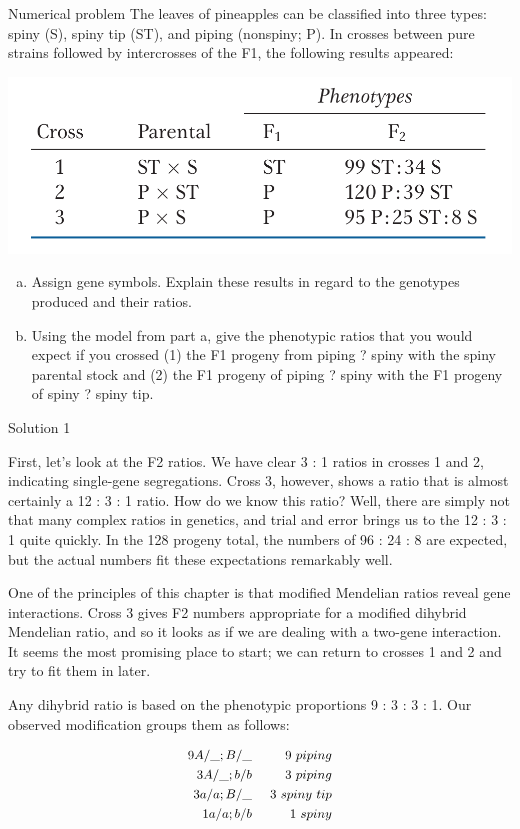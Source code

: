 \documentclass[11pt,ignorenonframetext,aspectratio=169]{beamer}
\providecommand{\tightlist}{%
  \setlength{\itemsep}{0pt}\setlength{\parskip}{0pt}}
\begin{document}
\begin{frame}{Numerical problem}
\protect\hypertarget{numerical-problem}{}
The leaves of pineapples can be classified into three types: spiny (S),
spiny tip (ST), and piping (nonspiny; P). In crosses between pure
strains followed by intercrosses of the F1, the following results
appeared:

\begin{center}\includegraphics[width=0.4\linewidth]{./images/pineapple_genetics} \end{center}

\begin{enumerate}
[a.]
\tightlist
\item
  Assign gene symbols. Explain these results in regard to the genotypes
  produced and their ratios.
\item
  Using the model from part a, give the phenotypic ratios that you would
  expect if you crossed (1) the F1 progeny from piping ? spiny with the
  spiny parental stock and (2) the F1 progeny of piping ? spiny with the
  F1 progeny of spiny ? spiny tip.
\end{enumerate}
\end{frame}

\begin{frame}{Solution 1}
\protect\hypertarget{solution-1}{}
\footnotesize

First, let's look at the F2 ratios. We have clear 3 : 1 ratios in
crosses 1 and 2, indicating single-gene segregations. Cross 3, however,
shows a ratio that is almost certainly a 12 : 3 : 1 ratio. How do we
know this ratio? Well, there are simply not that many complex ratios in
genetics, and trial and error brings us to the 12 : 3 : 1 quite quickly.
In the 128 progeny total, the numbers of 96 : 24 : 8 are expected, but
the actual numbers fit these expectations remarkably well.

One of the principles of this chapter is that modified Mendelian ratios
reveal gene interactions. Cross 3 gives F2 numbers appropriate for a
modified dihybrid Mendelian ratio, and so it looks as if we are dealing
with a two-gene interaction. It seems the most promising place to start;
we can return to crosses 1 and 2 and try to fit them in later.

Any dihybrid ratio is based on the phenotypic proportions 9 : 3 : 3 : 1.
Our observed modification groups them as follows:

\[
\small
\begin{aligned}
9A/\_;B/\_ &~& 9~piping \\
3A/\_;b/b &~& 3~piping \\
3a/a;B/\_ &~& 3~spiny~tip \\
1a/a;b/b &~& 1~spiny
\end{aligned}
\]
\end{frame}
\end{document}
